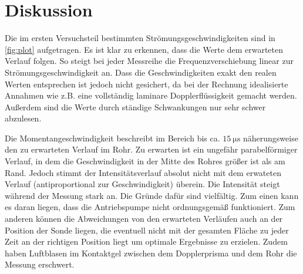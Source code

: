 \section{Diskussion}
\label{sec:Diskussion}
Die im ersten Versuchsteil bestimmten Strömungsgeschwindigkeiten sind in \autoref{fig:plot} aufgetragen.
Es ist klar zu erkennen, dass die Werte dem erwarteten Verlauf folgen.
So steigt bei jeder Messreihe die Frequenzverschiebung linear zur Strömungsgeschwindigkeit an.
Dass die Geschwindigkeiten exakt den realen Werten entsprechen ist jedoch nicht
gesichert, da bei der Rechnung idealisierte Annahmen wie z.B. eine vollständig laminare
Dopplerflüssigkeit gemacht werden. Außerdem sind die Werte durch ständige Schwankungen nur sehr schwer abzulesen.


Die Momentangeschwindigkeit beschreibt im Bereich bis ca. $\qty{15}{\micro\second}$ näherungsweise den zu erwarteten Verlauf im
Rohr. Zu erwarten ist ein ungefähr parabelförmiger Verlauf, in dem die Geschwindigkeit in der Mitte des Rohres größer ist als am Rand.  
Jedoch stimmt der Intensitätsverlauf absolut nicht mit dem 
erwateten Verlauf (antiproportional zur Geschwindigkeit) überein. Die Intensität steigt während der Messung stark an.
Die Gründe dafür sind vielfältig.
Zum einen kann es daran liegen, dass die Antriebspumpe nicht ordnungsgemäß funktioniert.
Zum anderen können die Abweichungen von den erwarteten Verläufen auch an der Position der Sonde liegen, die eventuell nicht mit der
gesamten Fläche zu jeder Zeit an der richtigen Position liegt um optimale Ergebnisse zu erzielen.
Zudem haben Luftblasen im Kontaktgel zwischen dem Dopplerprisma und dem Rohr die Messung erschwert.